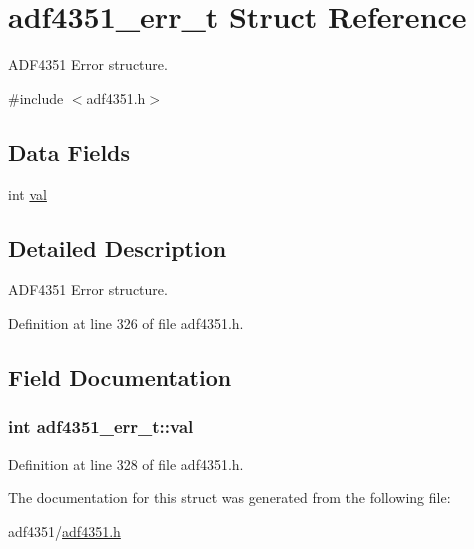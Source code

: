 \hypertarget{structadf4351__err__t}{}\section{adf4351\+\_\+err\+\_\+t Struct Reference}
\label{structadf4351__err__t}


A\+D\+F4351 Error structure.  




{\ttfamily \#include $<$adf4351.\+h$>$}

\subsection*{Data Fields}
\begin{DoxyCompactItemize}
\item 
int \hyperlink{structadf4351__err__t_ab5be0db827951d8d9f360b7b31238d7c}{val}
\end{DoxyCompactItemize}


\subsection{Detailed Description}
A\+D\+F4351 Error structure. 

Definition at line 326 of file adf4351.\+h.



\subsection{Field Documentation}
\subsubsection[{\texorpdfstring{val}{val}}]{\setlength{\rightskip}{0pt plus 5cm}int adf4351\+\_\+err\+\_\+t\+::val}\hypertarget{structadf4351__err__t_ab5be0db827951d8d9f360b7b31238d7c}{}\label{structadf4351__err__t_ab5be0db827951d8d9f360b7b31238d7c}


Definition at line 328 of file adf4351.\+h.



The documentation for this struct was generated from the following file\+:\begin{DoxyCompactItemize}
\item 
adf4351/\hyperlink{adf4351_8h}{adf4351.\+h}\end{DoxyCompactItemize}
